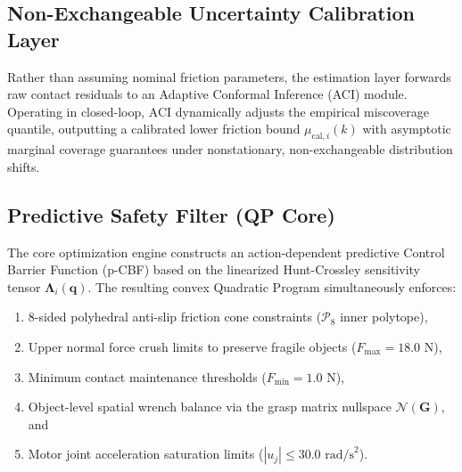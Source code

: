 \subsection{Non-Exchangeable Uncertainty Calibration Layer}
Rather than assuming nominal friction parameters, the estimation layer forwards raw contact residuals to an Adaptive Conformal Inference (ACI) module. Operating in closed-loop, ACI dynamically adjusts the empirical miscoverage quantile, outputting a calibrated lower friction bound $\mu_{\text{cal}, i}(k)$ with asymptotic marginal coverage guarantees under nonstationary, non-exchangeable distribution shifts.

\subsection{Predictive Safety Filter (QP Core)}
The core optimization engine constructs an action-dependent predictive Control Barrier Function (p-CBF) based on the linearized Hunt-Crossley sensitivity tensor $\mathbf{\Lambda}_i(\mathbf{q})$. The resulting convex Quadratic Program simultaneously enforces:
\begin{enumerate}
    \item 8-sided polyhedral anti-slip friction cone constraints ($\mathcal{P}_8$ inner polytope),
    \item Upper normal force crush limits to preserve fragile objects ($F_{\max} = 18.0\text{ N}$),
    \item Minimum contact maintenance thresholds ($F_{\min} = 1.0\text{ N}$),
    \item Object-level spatial wrench balance via the grasp matrix nullspace $\mathcal{N}(\mathbf{G})$, and
    \item Motor joint acceleration saturation limits ($|u_j| \le 30.0\text{ rad/s}^2$).
\end{enumerate}

